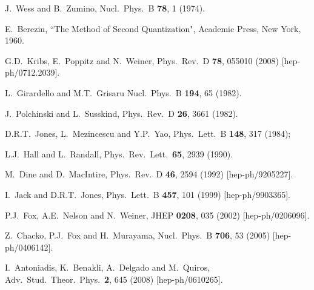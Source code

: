 \documentclass[12pt]{article}
\begin{document}
\begin{thebibliography}{999}
J.~Wess and B.~Zumino,
  Nucl.\ Phys.\ B {\bf 78}, 1 (1974).

 E.~Berezin, ``The Method of Second Quantization", 
Academic Press, New York, 1960.

  G.D.~Kribs, E.~Poppitz and N.~Weiner,
  Phys.\ Rev.\  D {\bf 78}, 055010 (2008)
  [hep-ph/0712.2039].

L.~Girardello and M.T.~Grisaru
  Nucl.\ Phys.\ B {\bf 194}, 65 (1982).

J.~Polchinski and L.~Susskind,
  Phys.\ Rev.\  D {\bf 26}, 3661 (1982).

D.R.T.~Jones, L.~Mezincescu and Y.P.~Yao,
  Phys.\ Lett.\ B {\bf 148}, 317 (1984);

L.J.~Hall and L.~Randall, 
  Phys.\ Rev.\ Lett.\  {\bf 65}, 2939 (1990).

  M.~Dine and D.~MacIntire,
  Phys.\ Rev.\  D {\bf 46}, 2594 (1992)
  [hep-ph/9205227].

I.~Jack and D.R.T.~Jones,
  Phys.\ Lett.\ B {\bf 457}, 101 (1999)
  [hep-ph/9903365].
   
P.J.~Fox, A.E.~Nelson and N.~Weiner,
  JHEP {\bf 0208}, 035 (2002)
  [hep-ph/0206096].

Z.~Chacko, P.J.~Fox and H.~Murayama,
  Nucl.\ Phys.\ B {\bf 706}, 53 (2005)
  [hep-ph/0406142].

  I.~Antoniadis, K.~Benakli, A.~Delgado and M.~Quiros,
  Adv.\ Stud.\ Theor.\ Phys.\ {\bf 2}, 645 (2008)
  [hep-ph/0610265].


\end{thebibliography}
\end{document}
